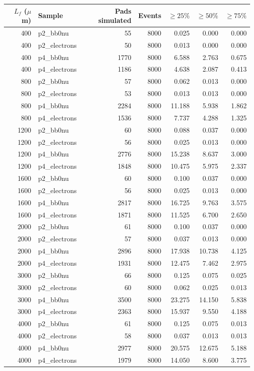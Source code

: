 \documentclass[10pt,a4paper]{article}
\begin{document}
\begin{center}\scriptsize
\begin{longtable}{rlrrrrr}\toprule
$L_f$ ($\mu$m) & Sample & Pads simulated & Events & $\geq25\%$ & $\geq50\%$ & $\geq75\%$\\\midrule
400 & p2\_bb0nu & 55 & 8000 & 0.025 & 0.000 & 0.000 \\
400 & p2\_electrons & 50 & 8000 & 0.013 & 0.000 & 0.000 \\
400 & p4\_bb0nu & 1770 & 8000 & 6.588 & 2.763 & 0.675 \\
400 & p4\_electrons & 1186 & 8000 & 4.638 & 2.087 & 0.413 \\
800 & p2\_bb0nu & 57 & 8000 & 0.062 & 0.013 & 0.000 \\
800 & p2\_electrons & 53 & 8000 & 0.013 & 0.013 & 0.000 \\
800 & p4\_bb0nu & 2284 & 8000 & 11.188 & 5.938 & 1.862 \\
800 & p4\_electrons & 1536 & 8000 & 7.737 & 4.288 & 1.325 \\
1200 & p2\_bb0nu & 60 & 8000 & 0.088 & 0.037 & 0.000 \\
1200 & p2\_electrons & 56 & 8000 & 0.025 & 0.013 & 0.000 \\
1200 & p4\_bb0nu & 2776 & 8000 & 15.238 & 8.637 & 3.000 \\
1200 & p4\_electrons & 1848 & 8000 & 10.475 & 5.975 & 2.337 \\
1600 & p2\_bb0nu & 60 & 8000 & 0.100 & 0.037 & 0.000 \\
1600 & p2\_electrons & 56 & 8000 & 0.025 & 0.013 & 0.000 \\
1600 & p4\_bb0nu & 2817 & 8000 & 16.725 & 9.763 & 3.575 \\
1600 & p4\_electrons & 1871 & 8000 & 11.525 & 6.700 & 2.650 \\
2000 & p2\_bb0nu & 61 & 8000 & 0.100 & 0.037 & 0.000 \\
2000 & p2\_electrons & 57 & 8000 & 0.037 & 0.013 & 0.000 \\
2000 & p4\_bb0nu & 2896 & 8000 & 17.938 & 10.738 & 4.125 \\
2000 & p4\_electrons & 1931 & 8000 & 12.475 & 7.462 & 2.975 \\
3000 & p2\_bb0nu & 66 & 8000 & 0.125 & 0.075 & 0.025 \\
3000 & p2\_electrons & 60 & 8000 & 0.062 & 0.025 & 0.013 \\
3000 & p4\_bb0nu & 3500 & 8000 & 23.275 & 14.150 & 5.838 \\
3000 & p4\_electrons & 2363 & 8000 & 15.937 & 9.550 & 4.188 \\
4000 & p2\_bb0nu & 61 & 8000 & 0.125 & 0.075 & 0.013 \\
4000 & p2\_electrons & 58 & 8000 & 0.037 & 0.013 & 0.013 \\
4000 & p4\_bb0nu & 2977 & 8000 & 20.575 & 12.675 & 5.188 \\
4000 & p4\_electrons & 1979 & 8000 & 14.050 & 8.600 & 3.775 \\
\bottomrule\end{longtable}\end{center}
\end{document}
